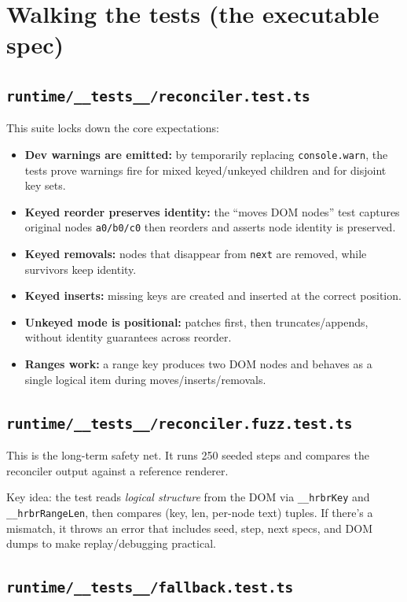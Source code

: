 \section{Walking the tests (the executable spec)}

\subsection{\texttt{runtime/\_\_tests\_\_/reconciler.test.ts}}

This suite locks down the core expectations:

\begin{itemize}
  \item \textbf{Dev warnings are emitted:} by temporarily replacing \texttt{console.warn}, the tests prove warnings fire for
  mixed keyed/unkeyed children and for disjoint key sets.
  \item \textbf{Keyed reorder preserves identity:} the “moves DOM nodes” test captures original nodes \texttt{a0/b0/c0} then reorders and asserts node identity is preserved.
  \item \textbf{Keyed removals:} nodes that disappear from \texttt{next} are removed, while survivors keep identity.
  \item \textbf{Keyed inserts:} missing keys are created and inserted at the correct position.
  \item \textbf{Unkeyed mode is positional:} patches first, then truncates/appends, without identity guarantees across reorder.
  \item \textbf{Ranges work:} a range key produces two DOM nodes and behaves as a single logical item during moves/inserts/removals.
\end{itemize}

\subsection{\texttt{runtime/\_\_tests\_\_/reconciler.fuzz.test.ts}}

This is the long-term safety net.
It runs 250 seeded steps and compares the reconciler output against a reference renderer.

Key idea: the test reads \emph{logical structure} from the DOM via \texttt{\_\_hrbrKey} and \texttt{\_\_hrbrRangeLen}, then compares (key, len, per-node text) tuples.
If there’s a mismatch, it throws an error that includes seed, step, next specs, and DOM dumps to make replay/debugging practical.

\subsection{\texttt{runtime/\_\_tests\_\_/fallback.test.ts}}

